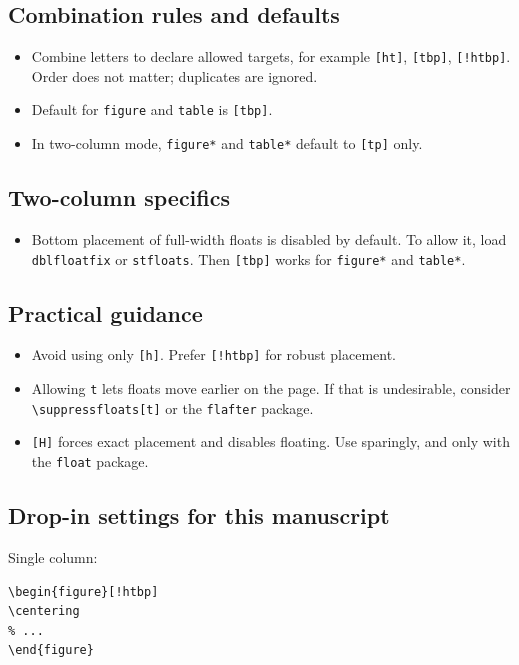 \subsection*{Combination rules and defaults}
\begin{itemize}
\item Combine letters to declare allowed targets, for example \texttt{[ht]},
\texttt{[tbp]}, \texttt{[!htbp]}. Order does not matter; duplicates are ignored.

\item Default for \texttt{figure} and \texttt{table} is \texttt{[tbp]}.

\item In two-column mode, \texttt{figure*} and \texttt{table*} default to
\texttt{[tp]} only.
\end{itemize}

\subsection*{Two-column specifics}
\begin{itemize}
\item Bottom placement of full-width floats is disabled by default. To allow
it, load \texttt{dblfloatfix} or \texttt{stfloats}. Then \texttt{[tbp]} works
for \texttt{figure*} and \texttt{table*}.
\end{itemize}

\subsection*{Practical guidance}
\begin{itemize}
\item Avoid using only \texttt{[h]}. Prefer \texttt{[!htbp]} for robust
placement.

\item Allowing \texttt{t} lets floats move earlier on the page. If that is undesirable,
consider \texttt{\textbackslash suppressfloats[t]} or the \texttt{flafter}
package.

\item \texttt{[H]} forces exact placement and disables floating. Use sparingly,
and only with the \texttt{float} package.
\end{itemize}

\subsection*{Drop-in settings for this manuscript}
Single column: \begin{verbatim}
\begin{figure}[!htbp]
\centering
% ...
\end{figure}
\end{verbatim}

